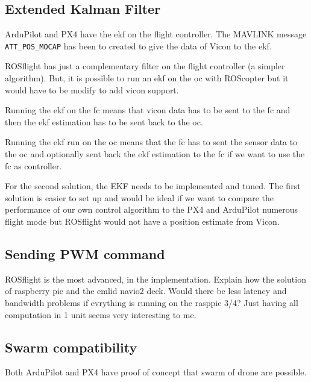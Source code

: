         \subsection{Extended Kalman Filter}
            ArduPilot and PX4 have the \gls{ekf} on the flight controller.
            The MAVLINK message \texttt{ATT\_POS\_MOCAP} has been to created to give the data of Vicon to the \gls{ekf}.
            
            ROSflight has just a complementary filter on the flight controller (a simpler algorithm).
            But, it is possible to run an \gls{ekf} on the \gls{oc} with ROScopter but it would have to be modify to add vicon support.
            
            Running the \gls{ekf} on the \gls{fc} means that vicon data has to be sent to the \gls{fc} and then the \gls{ekf} estimation has to be sent back to the \gls{oc}.
            
            Running the \gls{ekf} run on the \gls{oc} means that the \gls{fc} has to sent the sensor data to the \gls{oc} and optionally sent back the \gls{ekf} estimation to the \gls{fc} if we want to use the \gls{fc} as controller.
            
            For the second solution, the EKF needs to be implemented and tuned.
            The first solution is easier to set up and would be ideal if we want to compare the performance of our own control algorithm to the PX4 and ArduPilot numerous flight mode but ROSflight would not have a position estimate from Vicon.
            
        \subsection{Sending PWM command}
            ROSflight is the most advanced, in the implementation.
            {\color{red}Explain how the solution of raspberry pie and the emlid navio2 deck. Would there be less latency and bandwidth problems if evrything is running on the rasppie 3/4? Just having all computation in 1 unit seems very interesting to me.}
        
        \subsection{Swarm compatibility}
            Both ArduPilot \cite{ardupilot_multi_vehicle} and PX4 \cite{px4_multi_vehicle}
            have proof of concept that swarm of drone are possible.
            
